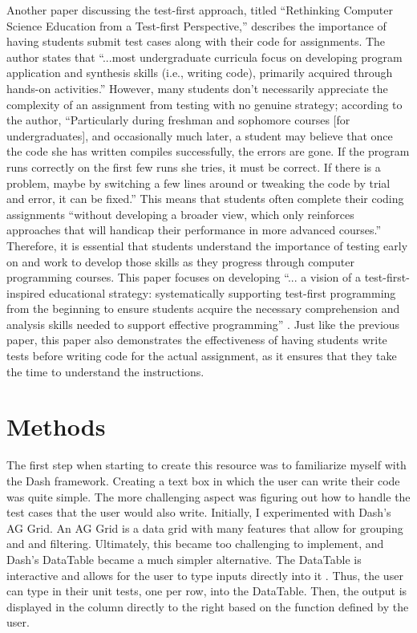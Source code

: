 \documentclass[10pt,twocolumn]{article}
\begin{document}
Another paper discussing the test-first approach, titled “Rethinking Computer Science Education from a Test-first Perspective,” describes the importance of having students submit test cases along with their code for assignments. The author states that “...most undergraduate curricula focus on developing program application and synthesis skills (i.e., writing code), primarily acquired through hands-on activities.” However, many students don’t necessarily appreciate the complexity of an assignment from testing with no genuine strategy; according to the author, “Particularly during freshman and sophomore courses [for undergraduates], and occasionally much later, a student may believe that once the code she has written compiles successfully, the errors are gone. If the program runs correctly on the first few runs she tries, it must be correct. If there is a problem, maybe by switching a few lines around or tweaking the code by trial and error, it can be fixed.” This means that students often complete their coding assignments “without developing a broader view, which only reinforces approaches that will handicap their performance in more advanced courses.” Therefore, it is essential that students understand the importance of testing early on and work to develop those skills as they progress through computer programming courses. This paper focuses on developing “... a vision of a test-first-inspired educational strategy: systematically supporting test-first programming from the beginning to ensure students acquire the necessary comprehension and analysis skills needed to support effective programming” \cite{Test-first}. Just like the previous paper, this paper also demonstrates the effectiveness of having students write tests before writing code for the actual assignment, as it ensures that they take the time to understand the instructions.

\section{Methods}

The first step when starting to create this resource was to familiarize myself with the Dash framework. Creating a text box in which the user can write their code was quite simple. The more challenging aspect was figuring out how to handle the test cases that the user would also write. Initially, I experimented with Dash's AG Grid. An AG Grid is a data grid with many features that allow for grouping and and filtering. Ultimately, this became too challenging to implement, and Dash's DataTable became a much simpler alternative. The DataTable is interactive and allows for the user to type inputs directly into it \cite{Dash}. Thus, the user can type in their unit tests, one per row, into the DataTable. Then, the output is displayed in the column directly to the right based on the function defined by the user.
\end{document}
